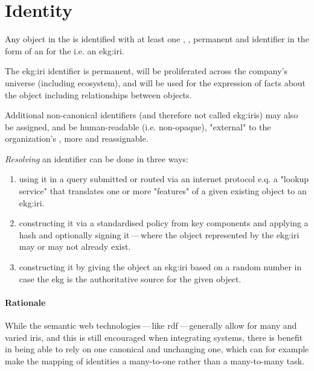 \section{Identity}\label{sec:ekg-principles-identity}

Any object in the  is identified with at least one , ,
permanent and  identifier in the form of an  for
the  i.e. an \gls{ekg:iri}.

The \gls{ekg:iri} identifier is permanent, will be proliferated across the company's universe (including ecosystem),
and will be used for the expression of facts about the object including relationships between objects.

Additional non-canonical identifiers (and therefore not called \glspl{ekg:iri}) may also be assigned,
and   be human-readable (i.e. non-opaque), "external" to
the organization's , more  and reassignable.

\textit{Resolving} an identifier can be done in three ways:
\begin{enumerate}
    \item using it in a query submitted or routed via an internet protocol e.q. a "lookup service" that translates
          one or more "features" of a given existing object to an \gls{ekg:iri}.
    \item constructing it via a standardised policy from key components and applying a hash and optionally
          signing it\,---\,where the object represented by the \gls{ekg:iri} may or may not already exist.
    \item constructing it by giving the object an \gls{ekg:iri} based on a random number in case the \gls{ekg} is
          the authoritative source for the given object.
\end{enumerate}

\paragraph{Rationale}

While the semantic web technologies\,---\,like \gls{rdf}\,---\,generally allow for many and varied \glspl{iri},
and this is still encouraged when integrating systems, there is benefit in being able to rely on one canonical
and unchanging one, which can for example make the mapping of identities a many-to-one rather than a many-to-many task.

